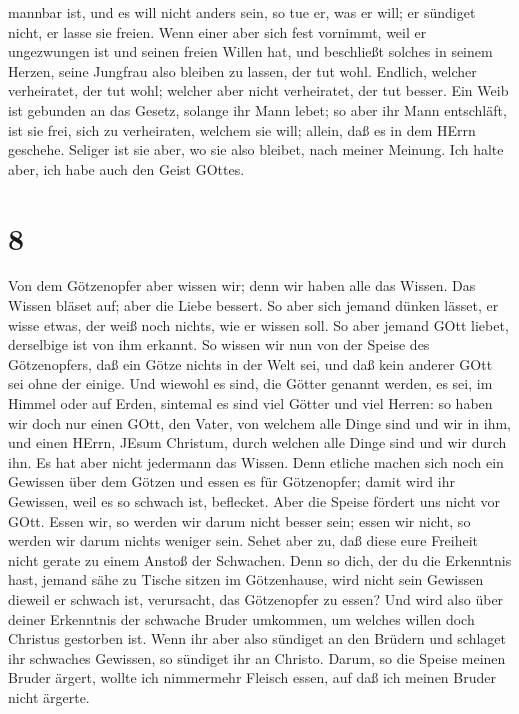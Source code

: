 mannbar ist, und es will nicht anders sein, so tue er, was er will; er
sündiget nicht, er lasse sie freien.  Wenn einer aber sich
fest vornimmt, weil er ungezwungen ist und seinen freien Willen hat, und
beschließt solches in seinem Herzen, seine Jungfrau also bleiben zu
lassen, der tut wohl.  Endlich, welcher verheiratet, der
tut wohl; welcher aber nicht verheiratet, der tut besser. 
Ein Weib ist gebunden an das Gesetz, solange ihr Mann lebet; so aber ihr
Mann entschläft, ist sie frei, sich zu verheiraten, welchem sie will;
allein, daß es in dem HErrn geschehe.  Seliger ist sie
aber, wo sie also bleibet, nach meiner Meinung. Ich halte aber, ich habe
auch den Geist GOttes.

\hypertarget{section-7}{%
\section{8}\label{section-7}}

 Von dem Götzenopfer aber wissen wir; denn wir haben alle
das Wissen. Das Wissen bläset auf; aber die Liebe bessert. 
So aber sich jemand dünken lässet, er wisse etwas, der weiß noch nichts,
wie er wissen soll.  So aber jemand GOtt liebet, derselbige
ist von ihm erkannt.  So wissen wir nun von der Speise des
Götzenopfers, daß ein Götze nichts in der Welt sei, und daß kein anderer
GOtt sei ohne der einige.  Und wiewohl es sind, die Götter
genannt werden, es sei, im Himmel oder auf Erden, sintemal es sind viel
Götter und viel Herren:  so haben wir doch nur einen GOtt,
den Vater, von welchem alle Dinge sind und wir in ihm, und einen HErrn,
JEsum Christum, durch welchen alle Dinge sind und wir durch ihn.
 Es hat aber nicht jedermann das Wissen. Denn etliche machen
sich noch ein Gewissen über dem Götzen und essen es für Götzenopfer;
damit wird ihr Gewissen, weil es so schwach ist, beflecket. 
Aber die Speise fördert uns nicht vor GOtt. Essen wir, so werden wir
darum nicht besser sein; essen wir nicht, so werden wir darum nichts
weniger sein.  Sehet aber zu, daß diese eure Freiheit nicht
gerate zu einem Anstoß der Schwachen.  Denn so dich, der du
die Erkenntnis hast, jemand sähe zu Tische sitzen im Götzenhause, wird
nicht sein Gewissen dieweil er schwach ist, verursacht, das Götzenopfer
zu essen?  Und wird also über deiner Erkenntnis der
schwache Bruder umkommen, um welches willen doch Christus gestorben ist.
 Wenn ihr aber also sündiget an den Brüdern und schlaget
ihr schwaches Gewissen, so sündiget ihr an Christo.  Darum,
so die Speise meinen Bruder ärgert, wollte ich nimmermehr Fleisch essen,
auf daß ich meinen Bruder nicht ärgerte.

